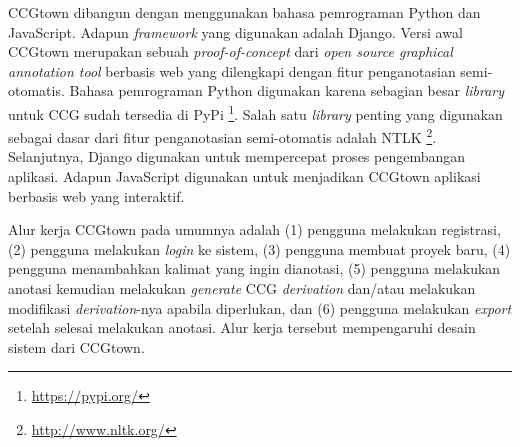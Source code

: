 





CCGtown dibangun dengan menggunakan bahasa pemrograman Python dan JavaScript.
Adapun \textit{framework} yang digunakan adalah Django.
Versi awal CCGtown merupakan sebuah \textit{proof-of-concept} dari
\textit{open source graphical annotation tool} berbasis web yang dilengkapi dengan fitur
penganotasian semi-otomatis.
Bahasa pemrograman Python digunakan karena sebagian besar \textit{library} untuk CCG
sudah tersedia di PyPi \footnote{\url{https://pypi.org/}}.
Salah satu \textit{library} penting yang digunakan sebagai dasar dari fitur penganotasian
semi-otomatis adalah NTLK \footnote{\url{http://www.nltk.org/}}.
Selanjutnya, Django digunakan untuk mempercepat proses pengembangan aplikasi.
Adapun JavaScript digunakan untuk menjadikan CCGtown aplikasi berbasis web yang interaktif.

Alur kerja CCGtown pada umumnya adalah (1) pengguna melakukan registrasi, (2) pengguna
melakukan \textit{login} ke sistem, (3) pengguna membuat proyek baru, (4) pengguna
menambahkan kalimat yang ingin dianotasi, (5) pengguna melakukan anotasi kemudian melakukan
\textit{generate} CCG \textit{derivation} dan/atau melakukan modifikasi
\textit{derivation}-nya apabila diperlukan, dan (6) pengguna melakukan \textit{export}
setelah selesai melakukan anotasi. Alur kerja tersebut mempengaruhi desain sistem dari
CCGtown.

